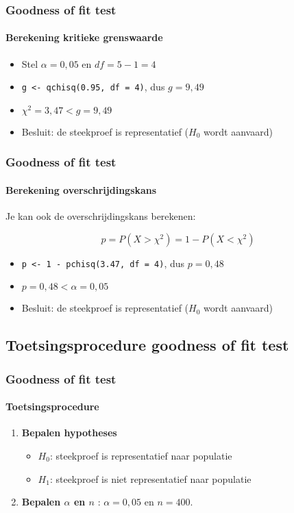 \documentclass[aspectratio=169]{beamer}
\begin{document}
\begin{frame}[fragile]
  \frametitle{Goodness of fit test}
  \framesubtitle{Berekening kritieke grenswaarde}
  
  \begin{itemize}
    \item Stel $\alpha = 0,05$ en $df = 5 - 1 = 4$
    \item \verb|g <- qchisq(0.95, df = 4)|, dus $g = 9,49$
    \item $\chi^{2} = 3,47 < g = 9,49$
    \item Besluit: de steekproef is representatief ($H_0$ wordt aanvaard)
  \end{itemize}
\end{frame}

\begin{frame}[fragile]
  \frametitle{Goodness of fit test}
  \framesubtitle{Berekening overschrijdingskans}
  
  Je kan ook de overschrijdingskans berekenen:
  
  \[ p = P(X > \chi^2) = 1 - P(X < \chi^2) \]
  
  \begin{itemize}
    \item \verb|p <- 1 - pchisq(3.47, df = 4)|, dus $p = 0,48$
    \item $p = 0,48 < \alpha = 0,05$
    \item Besluit: de steekproef is representatief ($H_0$ wordt aanvaard)
  \end{itemize}
\end{frame}

\subsection{Toetsingsprocedure goodness of fit test}

\begin{frame}
  \frametitle{Goodness of fit test}
  \framesubtitle{Toetsingsprocedure}
  
  \begin{enumerate}
    \item \textbf{Bepalen hypotheses}
    \begin{itemize}
      \item $H_{0}$: steekproef is representatief naar populatie
      \item $H_{1}$: steekproef is niet representatief naar populatie
    \end{itemize}
    \item \textbf{Bepalen $\alpha$ en $n$} : $\alpha = 0,05$ en $n = 400$.
  \end{enumerate}
\end{frame}
\end{document}
